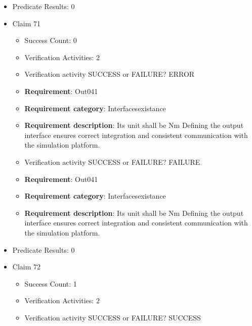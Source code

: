 \documentclass{article}
\begin{document}
\begin{itemize}
\begin{itemize}
					\item Verification activity SUCCESS or FAILURE? FAILURE
		
						\item \textbf{Requirement}: Out040 
						\item \textbf{Requirement category}: Interfacesexistance 
						\item \textbf{Requirement description}: Its unit shall be Nm Defining the output interface ensures correct integration and consistent communication with the simulation platform.
					
				\end{itemize}
				
									    
				\item Predicate Results: 0

  				  \item Claim 71
				\begin{itemize}
			    	\item Success Count: 0 
			    	\item Verification Activities: 2
					\item Verification activity SUCCESS or FAILURE? ERROR
		
						\item \textbf{Requirement}: Out041 
						\item \textbf{Requirement category}: Interfacesexistance 
						\item \textbf{Requirement description}: Its unit shall be Nm Defining the output interface ensures correct integration and consistent communication with the simulation platform.
					
					\item Verification activity SUCCESS or FAILURE? FAILURE
		
						\item \textbf{Requirement}: Out041 
						\item \textbf{Requirement category}: Interfacesexistance 
						\item \textbf{Requirement description}: Its unit shall be Nm Defining the output interface ensures correct integration and consistent communication with the simulation platform.
					
				\end{itemize}
				
									    
				\item Predicate Results: 0

  				  \item Claim 72
				\begin{itemize}
			    	\item Success Count: 1 
			    	\item Verification Activities: 2
					\item Verification activity SUCCESS or FAILURE? SUCCESS
		

\end{itemize}
\end{itemize}
\end{document}
